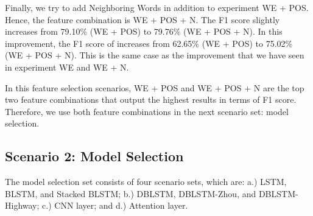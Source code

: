 {{Finally, we try to add Neighboring Words in addition to experiment WE + POS. Hence, the feature combination is WE + POS + N. The F1 score slightly increases from 79.10\% (WE + POS) to 79.76\% (WE + POS + N). In this improvement, the F1 score of \greet increases from 62.65\% (WE + POS) to 75.02\% (WE + POS + N). This is the same case as the improvement that we have seen in experiment WE and WE + N. 


In this feature selection scenarios, WE + POS and WE + POS + N are the top two feature combinations that output the highest results in terms of F1 score. Therefore, we use both feature combinations in the next scenario set: model selection.

\subsection{Scenario 2: Model Selection}
The model selection set consists of four scenario sets, which are: a.) LSTM, BLSTM, and Stacked BLSTM; b.) DBLSTM, DBLSTM-Zhou, and DBLSTM-Highway; c.) CNN layer; and d.) Attention layer.

%

}}

